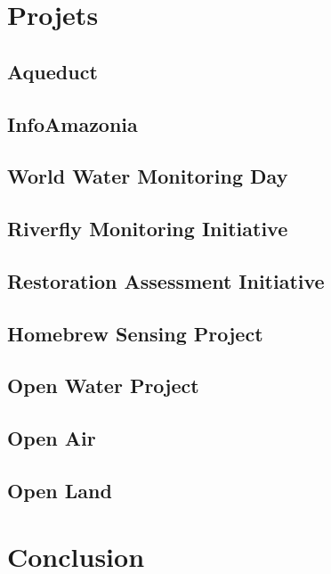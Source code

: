 \documentclass[a4paper,11pt,titlepage]{article}
\begin{document}
	\section{Projets}
		\subsection{Aqueduct}
		\subsection{InfoAmazonia}
		\subsection{World Water Monitoring Day}
		\subsection{Riverfly Monitoring Initiative}
		\subsection{Restoration Assessment Initiative}
		\subsection{Homebrew Sensing Project}
		\subsection{Open Water Project}
		\subsection{Open Air}
		\subsection{Open Land}
	
	\section{Conclusion}
	\newpage
	
	
	
\end{document}
